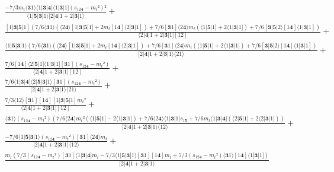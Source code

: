 \documentclass[varwidth, border=5pt]{standalone}
\begin{document}
\begin{my}
$\begin{gathered}
\scriptscriptstyle\frac{-7/3m_t⟨𝟑1⟩⟨1|𝟑|𝟒]⟨1|𝟑|1](s_{12𝟒}-m_t²)²}{⟨1|𝟓|𝟑|1⟩[2|𝟒|1+2|𝟑|1⟩} +\\
\scriptscriptstyle\frac{[1|𝟑|𝟓|1](7/6⟨𝟑1⟩(⟨2𝟒⟩[1|𝟑|𝟓|1]+2m_t[1𝟒]⟨2|𝟑|1])+7/6[𝟑1]⟨2𝟒⟩m_t(⟨1|𝟓|1]+2⟨1|𝟑|1])+7/6[𝟑|𝟓|2⟩[1𝟒]⟨1|𝟑|1])}{⟨2|𝟒|1+2|𝟑|1][12]} +\\
\scriptscriptstyle\frac{⟨1|𝟓|𝟑|1⟩(7/6⟨𝟑1⟩(⟨2𝟒⟩[1|𝟑|𝟓|1]+2m_t[1𝟒]⟨2|𝟑|1])+7/6[𝟑1]⟨2𝟒⟩m_t(⟨1|𝟓|1]+2⟨1|𝟑|1])+7/6[𝟑|𝟓|2⟩[1𝟒]⟨1|𝟑|1])}{[2|𝟒|1+2|𝟑|1⟩⟨21⟩} +\\
\scriptscriptstyle\frac{7/6[1𝟒]⟨2|𝟓|1]⟨1|𝟑|1][𝟑1](s_{12𝟒}-m_t²)}{⟨2|𝟒|1+2|𝟑|1][12]} +\\
\scriptscriptstyle\frac{7/6⟨1|𝟑|𝟒]⟨2|𝟓|𝟑|1⟩[𝟑1](s_{12𝟒}-m_t²)}{[2|𝟒|1+2|𝟑|1⟩⟨21⟩} +\\
\scriptscriptstyle\frac{7/3⟨12⟩[𝟑1][1𝟒][1|𝟑|𝟓|1]m_t²}{⟨2|𝟒|1+2|𝟑|1][12]} +\\
\scriptscriptstyle\frac{⟨𝟑1⟩(s_{12𝟒}-m_t²)(7/6⟨2𝟒⟩m_t²(⟨1|𝟓|1]-2⟨1|𝟑|1])+7/6⟨2𝟒⟩⟨1|𝟑|1]s_{1𝟓}+7/6m_t⟨1|𝟑|𝟒](⟨2|𝟓|1]+2⟨2|𝟑|1]))}{[2|𝟒|1+2|𝟑|1⟩⟨12⟩} +\\
\scriptscriptstyle\frac{-7/6⟨1|𝟓|𝟑|1⟩(s_{12𝟒}-m_t²)[𝟑1]⟨2𝟒⟩m_t}{[2|𝟒|1+2|𝟑|1⟩⟨12⟩} +\\
\scriptscriptstyle\frac{m_t(7/3(s_{12𝟒}-m_t²)[𝟑1]⟨1|𝟑|𝟒]m_t-7/3⟨1|𝟓|𝟑|1⟩[𝟑1][1𝟒]m_t+7/3(s_{12𝟒}-m_t²)⟨𝟑1⟩[1𝟒]⟨1|𝟑|1])}{[2|𝟒|1+2|𝟑|1⟩} \phantom{+}
\end{gathered}$
\end{my}
\end{document}
